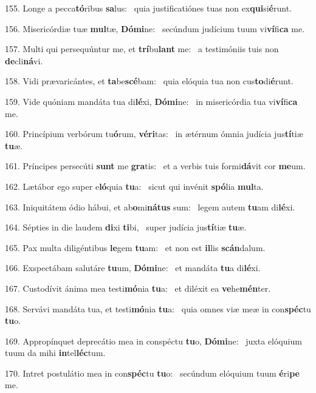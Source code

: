 155. Longe a pecca\textbf{tó}ribus \textbf{sa}lus: \ast\  quia justificatiónes tuas non ex\textbf{qui}si\textbf{é}runt.\

156. Misericórdiæ tuæ \textbf{mul}tæ, \textbf{Dó}\textbf{mi}ne: \ast\  secúndum judícium tuum vi\textbf{ví}fi\textbf{ca} me.\

157. Multi qui persequúntur me, et \textbf{trí}bu\textbf{lant} me: \ast\  a testimóniis tuis non \textbf{de}cli\textbf{ná}vi.\

158. Vidi prævaricántes, et \textbf{ta}be\textbf{scé}bam: \ast\  quia elóquia tua non cus\textbf{to}di\textbf{é}runt.\

159. Vide quóniam mandáta tua di\textbf{lé}xi, \textbf{Dó}\textbf{mi}ne: \ast\  in misericórdia tua vi\textbf{ví}fi\textbf{ca} me.\

160. Princípium verbórum tu\textbf{ó}rum, \textbf{vé}\textbf{ri}tas: \ast\  in ætérnum ómnia judícia jus\textbf{tí}tiæ \textbf{tu}æ.\

161. Príncipes persecúti \textbf{sunt} me \textbf{gra}tis: \ast\  et a verbis tuis formi\textbf{dá}vit cor \textbf{me}um.\

162. Lætábor ego super e\textbf{ló}quia \textbf{tu}a: \ast\  sicut qui invénit \textbf{spó}lia \textbf{mul}ta.\

163. Iniquitátem ódio hábui, et ab\textbf{o}mi\textbf{ná}\textbf{tus} sum: \ast\  legem autem \textbf{tu}am di\textbf{lé}xi.\

164. Sépties in die laudem \textbf{di}xi \textbf{ti}bi, \ast\  super judícia jus\textbf{tí}tiæ \textbf{tu}æ.\

165. Pax multa diligéntibus \textbf{le}gem \textbf{tu}am: \ast\  et non est \textbf{il}lis \textbf{scán}dalum.\

166. Exspectábam salutáre \textbf{tu}um, \textbf{Dó}\textbf{mi}ne: \ast\  et mandáta \textbf{tu}a di\textbf{lé}xi.\

167. Custodívit ánima mea testi\textbf{mó}nia \textbf{tu}a: \ast\  et diléxit ea \textbf{ve}he\textbf{mén}ter.\

168. Servávi mandáta tua, et testi\textbf{mó}nia \textbf{tu}a: \ast\  quia omnes viæ meæ in con\textbf{spéc}tu \textbf{tu}o.\

169. Appropínquet deprecátio mea in conspéctu \textbf{tu}o, \textbf{Dó}\textbf{mi}ne: \ast\  juxta elóquium tuum da mihi \textbf{in}tel\textbf{léc}tum.\

170. Intret postulátio mea in con\textbf{spéc}tu \textbf{tu}o: \ast\  secúndum elóquium tuum \textbf{é}ri\textbf{pe} me.\


